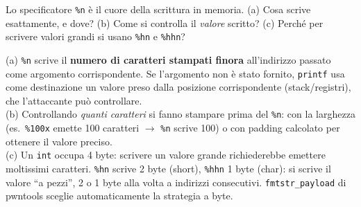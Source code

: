 \question[6]
Lo specificatore \lstinline|%n| è il cuore della scrittura in memoria. (a) Cosa scrive esattamente, e dove? (b) Come si controlla il \emph{valore} scritto? (c) Perché per scrivere valori grandi si usano \lstinline|%hn| e \lstinline|%hhn|?
\begin{solution}
(a) \lstinline|%n| scrive il \textbf{numero di caratteri stampati finora} all'indirizzo passato come argomento corrispondente. Se l'argomento non è stato fornito, \lstinline|printf| usa come destinazione un valore preso dalla posizione corrispondente (stack/registri), che l'attaccante può controllare.\\
(b) Controllando \emph{quanti caratteri} si fanno stampare prima del \lstinline|%n|: con la larghezza (es.\ \lstinline|%100x| emette 100 caratteri $\to$ \lstinline|%n| scrive 100) o con padding calcolato per ottenere il valore preciso.\\
(c) Un \lstinline|int| occupa 4 byte: scrivere un valore grande richiederebbe emettere moltissimi caratteri. \lstinline|%hn| scrive 2 byte (short), \lstinline|%hhn| 1 byte (char): si scrive il valore ``a pezzi'', 2 o 1 byte alla volta a indirizzi consecutivi. \lstinline|fmtstr_payload| di pwntools sceglie automaticamente la strategia a byte.
\end{solution}
